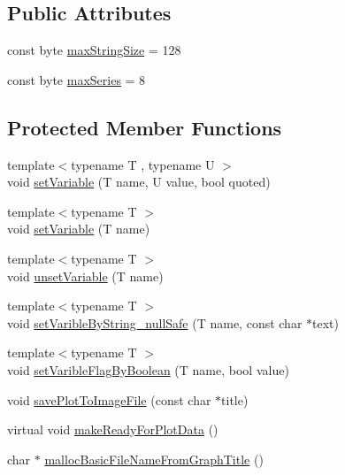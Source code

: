 \subsection*{Public Attributes}
\begin{DoxyCompactItemize}
\item 
const byte \hyperlink{class_serial_graph_a1867ab3a93268646490fa7ba4f8b5680}{max\+String\+Size} = 128
\item 
const byte \hyperlink{class_serial_graph_a752a1429bd35687163fe11c5a2562bef}{max\+Series} = 8
\end{DoxyCompactItemize}
\subsection*{Protected Member Functions}
\begin{DoxyCompactItemize}
\item 
{\footnotesize template$<$typename T , typename U $>$ }\\void \hyperlink{class_g_n_u_plot_base_a03d371b0c6c7ef89064525438b22d52c}{set\+Variable} (T name, U value, bool quoted)
\item 
{\footnotesize template$<$typename T $>$ }\\void \hyperlink{class_g_n_u_plot_base_a3c8c8f68c13661d91bd844589e1a2a85}{set\+Variable} (T name)
\item 
{\footnotesize template$<$typename T $>$ }\\void \hyperlink{class_g_n_u_plot_base_af9b418bbcafb41d4d51b92018ca4f217}{unset\+Variable} (T name)
\item 
{\footnotesize template$<$typename T $>$ }\\void \hyperlink{class_g_n_u_plot_base_a68171bf36461e54e2b81384c112ad975}{set\+Varible\+By\+String\+\_\+null\+Safe} (T name, const char $\ast$text)
\item 
{\footnotesize template$<$typename T $>$ }\\void \hyperlink{class_g_n_u_plot_base_ae93c5de3241c2b6b6f703a202dc1d94b}{set\+Varible\+Flag\+By\+Boolean} (T name, bool value)
\item 
void \hyperlink{class_g_n_u_plot_base_ab5c851953dd140cc3ee936a5cd329200}{save\+Plot\+To\+Image\+File} (const char $\ast$title)
\item 
virtual void \hyperlink{class_g_n_u_plot_base_adaf91c191e4d889537d401faeb863485}{make\+Ready\+For\+Plot\+Data} ()
\item 
char $\ast$ \hyperlink{class_g_n_u_plot_base_a7f71f3c616b3a4a854f9118a04c40447}{malloc\+Basic\+File\+Name\+From\+Graph\+Title} ()

\end{DoxyCompactItemize}
